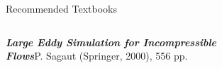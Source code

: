 \begin{frame}{Recommended Textbooks}

\setlength{\fboxsep}{0pt}
\setlength{\fboxrule}{1pt}
\begin{columns}[T]
    \begin{column}{.75\textwidth}
      \begin{minipage}[c][.5\textheight][c]{\linewidth}
      \emph{\textbf{Large Eddy Simulation for Incompressible \\Flows}}\newline P. Sagaut (Springer, 2000), 556 pp.
      \end{minipage}
    \end{column}
    \begin{column}{.25\textwidth}
    \end{column}
  \end{columns}
\end{frame}


